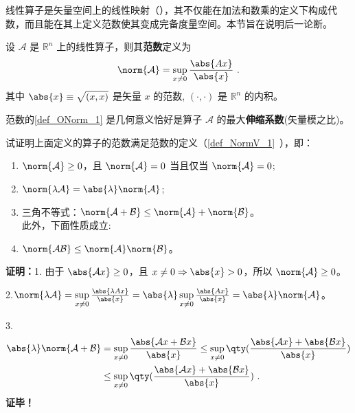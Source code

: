 线性算子是矢量空间上的线性映射（），其不仅能在加法和数乘的定义下构成代数，而且能在其上定义范数使其变成完备度量空间。本节旨在说明后一论断。
\begin{definition}{}\label{def_ONorm_1}
设 $\mathcal A$ 是 $\mathbb R^n$ 上的线性算子，则其\textbf{范数}定义为
\begin{equation}
\norm{\mathcal A}=\sup_{x\neq0}\frac{\abs{Ax}}{\abs{x}}~.
\end{equation}
其中 $\abs{x}\equiv\sqrt{(x,x)}$ 是矢量 $x$ 的范数, $(\cdot,\cdot)$ 是 $\mathbb R^n$ 的内积。
\end{definition}
范数的\autoref{def_ONorm_1} 是几何意义恰好是算子 $\mathcal A$ 的最大\textbf{伸缩系数}(矢量模之比)。
\begin{example}{}
试证明上面定义的算子的范数满足范数的定义（\autoref{def_NormV_1}~），即：
\begin{enumerate}
\item $\norm{\mathcal A}\geq0$，且 $\norm{\mathcal A}=0$ 当且仅当 $\norm{\mathcal A}=0$;
\item $\norm{\lambda \mathcal A}=\abs{\lambda}\norm{\mathcal A}$;
\item 三角不等式：$\norm{\mathcal A+\mathcal B}\leq\norm{\mathcal A}+\norm{\mathcal B}$。\\
此外，下面性质成立:\\
\item $\norm{\mathcal{AB}}\leq{\norm{\mathcal A}}\norm{\mathcal B}$。
\end{enumerate}
\end{example}
\textbf{证明：}1. 由于 $\abs{\mathcal A x}\geq0$，且 $x\neq0\Rightarrow\abs{x}>0$，所以
$\norm{\mathcal A}\geq0$。

2.$\norm{\lambda\mathcal A}=\sup\limits_{x\neq0}\frac{\abs{\lambda Ax}}{\abs{x}}=\abs{\lambda}\sup\limits_{x\neq0}\frac{\abs{Ax}}{\abs{x}}=\abs{\lambda}\norm{\mathcal A}
$。

3.\begin{equation}
\begin{aligned}
\abs{\lambda}\norm{\mathcal A+\mathcal B}&=\sup\limits_{x\neq0}\frac{\abs{\mathcal Ax+\mathcal B x}}{\abs{x}}\leq\sup\limits_{x\neq0}\qty(\frac{\abs{\mathcal Ax}+\abs{\mathcal B x}}{\abs{x}})\\
&\leq \sup\limits_{x\neq0}\qty(\frac{\abs{ \mathcal Ax}+\abs{\mathcal B x}}{\abs{x}})~.
\end{aligned}
\end{equation}
\textbf{证毕！}
